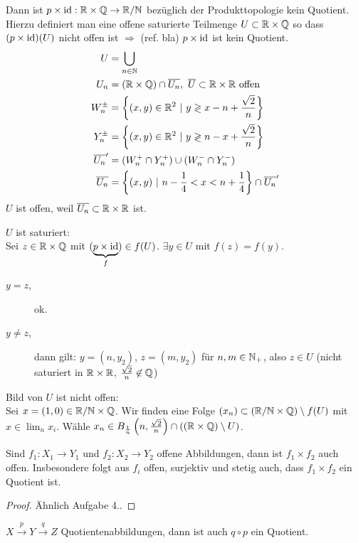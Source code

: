 \documentclass{skript}
\begin{document}
\begin{stz}
\begin{bsp}
        Dann ist $p\times\operatorname{id}:\mathbb{R}\times\mathbb{Q}\to\mathbb{R}/\mathbb{N}$ bezüglich der Produkttopologie
        kein Quotient. Hierzu definiert man eine offene saturierte Teilmenge
        $U\subset\mathbb{R}\times\mathbb{Q}$ so dass $(p\times\operatorname{id})(U)$ nicht offen ist
        $\Rightarrow$ (ref. bla) $p\times\operatorname{id}$ ist kein Quotient.
        \begin{align}
            U &= \bigcup_{n\in\N} \\
            U_n &= (\R\times\Q)\cap \overline{U_n},\ \overline{U}
                    \subset\R\times\R \text{ offen} \\
            W_n^\pm &= \mdef[(x,y)\in\R^2]{y \gtrless x - n +
                    \frac{\sqrt 2}{n}} \\
            Y_n^\pm &= \mdef[(x,y)\in\R^2]{y \gtrless n - x +
                    \frac{\sqrt 2}{n}} \\
            \overline{U_n}' &= (W^+_n \cap Y^+_n) \cup (W^-_n \cap Y^-_n) \\
            \overline{U_n} &= \mdef[(x,y)]{n-\frac{1}{4}<x<n+\frac{1}{4}} \cap
                    \overline{U_n}'
        \end{align}
        $U$ ist offen, weil $\overline{U_n} \subset \mathbb{R}\times\mathbb{R}$ ist.

        $U$ ist saturiert:\\
        Sei $z\in\mathbb{R}\times\mathbb{Q}$ mit $(\underset{f}{\underbrace{p\times\operatorname{id}}})\in
        f(U)$. $\exists y\in U$ mit $f(z) = f(y)$.
        \begin{description}
            \item[$y=z$,] ok.
            \item[$y\neq z$,] dann gilt: $y = (n, y_2)$, $z = (m,y_2)$ für
                $n,m\in\mathbb{N}_+$, also $z\in U$ (nicht saturiert in $\mathbb{R}\times\mathbb{R}$,
                $\frac{\sqrt 2}{n}\not\in\mathbb{Q}$)
        \end{description}

        Bild von $U$ ist nicht offen:\\
        Sei $x=(1,0)\in\mathbb{R}/\mathbb{N}\times\mathbb{Q}$. Wir finden eine Folge
        $(x_n)\subset(\mathbb{R}/\mathbb{N}\times\mathbb{Q})\setminus f(U)$ mit $x\in\lim_n x_i$. Wähle
        $x_n\in B_{\frac{1}{n}}\left( n, \frac{\sqrt 2}{n} \right)\cap (
        (\mathbb{R}\times\mathbb{Q})\setminus U)$.
    \end{bsp}
\end{stz}

\begin{stz}
    Sind $f_1:X_1\to Y_1$ und $f_2:X_2\to Y_2$ offene Abbildungen, dann ist
    $f_1\times f_2$ auch offen. Insbesondere folgt aus $f_i$ offen, surjektiv
    und stetig auch, dass $f_1\times f_2$ ein Quotient ist.
    \begin{proof}
        Ähnlich Aufgabe 4..
    \end{proof}
\end{stz}
\begin{stz}
    $X\overset{p}{\to}Y\overset{q}{\to}Z$ Quotientenabbildungen, dann ist auch
    $q\circ p$ ein Quotient.
\end{stz}
\end{document}

